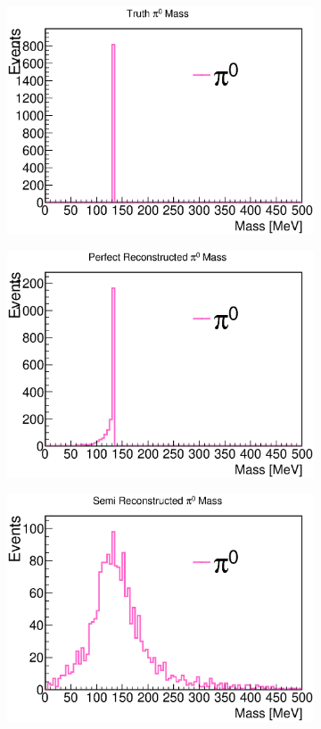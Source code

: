 \begin{figure}[htbp]
\begin{center}
\begin{subfigure}{0.45\textwidth}
\includegraphics[width=0.9\linewidth]{figs/mc/single_pi0/MCPi0Mass.eps}
\caption{}
\end{subfigure}
\begin{subfigure}{0.45\textwidth}
\includegraphics[width=0.9\linewidth]{figs/mc/single_pi0/PerfectRecoPi0Mass.eps}
\caption{}
\end{subfigure}
\begin{subfigure}{0.45\textwidth}
\includegraphics[width=0.9\linewidth]{figs/mc/single_pi0/DepERecoThetaPi0Mass.eps}

\end{subfigure}
\end{center}
\end{figure}
